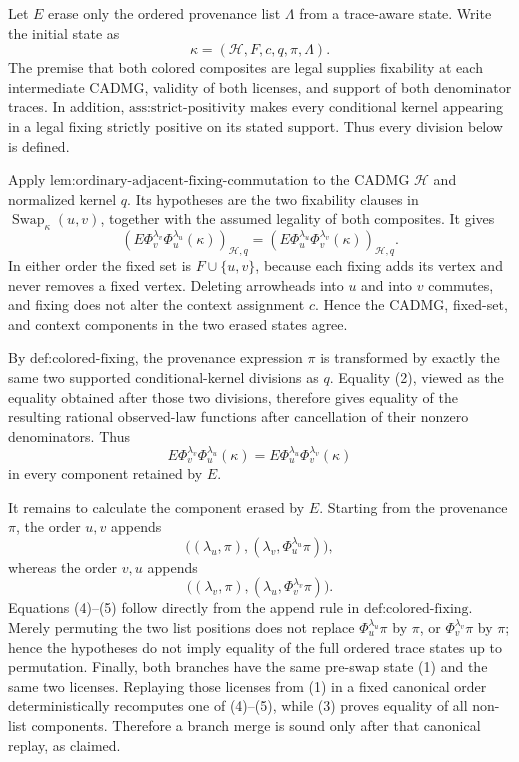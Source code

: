 Let \(E\) erase only the ordered provenance list \(\Lambda\) from a trace-aware state.  Write the initial state as
\[
\kappa=(\mathcal H,F,c,q,\pi,\Lambda).
\tag{1}
\]
The premise that both colored composites are legal supplies fixability at each intermediate CADMG, validity of both licenses, and support of both denominator traces.  In addition, \(\text{ass:strict-positivity}\) makes every conditional kernel appearing in a legal fixing strictly positive on its stated support.  Thus every division below is defined.

Apply \(\text{lem:ordinary-adjacent-fixing-commutation}\) to the CADMG \(\mathcal H\) and normalized kernel \(q\).  Its hypotheses are the two fixability clauses in \(\operatorname{Swap}_{\kappa}(u,v)\), together with the assumed legality of both composites.  It gives
\[
\left(E\Phi_v^{\lambda_v}\Phi_u^{\lambda_u}(\kappa)\right)_{\mathcal H,q}
=
\left(E\Phi_u^{\lambda_u}\Phi_v^{\lambda_v}(\kappa)\right)_{\mathcal H,q}.
\tag{2}
\]
In either order the fixed set is \(F\cup\{u,v\}\), because each fixing adds its vertex and never removes a fixed vertex.  Deleting arrowheads into \(u\) and into \(v\) commutes, and fixing does not alter the context assignment \(c\).  Hence the CADMG, fixed-set, and context components in the two erased states agree.

By \(\text{def:colored-fixing}\), the provenance expression \(\pi\) is transformed by exactly the same two supported conditional-kernel divisions as \(q\).  Equality (2), viewed as the equality obtained after those two divisions, therefore gives equality of the resulting rational observed-law functions after cancellation of their nonzero denominators.  Thus
\[
E\Phi_v^{\lambda_v}\Phi_u^{\lambda_u}(\kappa)
=
E\Phi_u^{\lambda_u}\Phi_v^{\lambda_v}(\kappa)
\tag{3}
\]
in every component retained by \(E\).

It remains to calculate the component erased by \(E\).  Starting from the provenance \(\pi\), the order \(u,v\) appends
\[
\bigl((\lambda_u,\pi),(\lambda_v,\Phi_u^{\lambda_u}\pi)\bigr),
\tag{4}
\]
whereas the order \(v,u\) appends
\[
\bigl((\lambda_v,\pi),(\lambda_u,\Phi_v^{\lambda_v}\pi)\bigr).
\tag{5}
\]
Equations (4)--(5) follow directly from the append rule in \(\text{def:colored-fixing}\).  Merely permuting the two list positions does not replace \(\Phi_u^{\lambda_u}\pi\) by \(\pi\), or \(\Phi_v^{\lambda_v}\pi\) by \(\pi\); hence the hypotheses do not imply equality of the full ordered trace states up to permutation.  Finally, both branches have the same pre-swap state (1) and the same two licenses.  Replaying those licenses from (1) in a fixed canonical order deterministically recomputes one of (4)--(5), while (3) proves equality of all non-list components.  Therefore a branch merge is sound only after that canonical replay, as claimed.